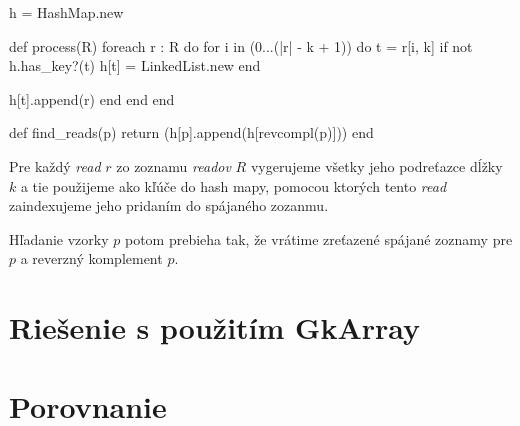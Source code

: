 \begin{pseudocode}[label=lst:hash_algorithm,caption={Algoritmus na riešenie
problému zarovnania readov pomocou hash mapy}]
h = HashMap.new

def process(R)
  foreach r : R do
    for i in (0...(|r| - k + 1)) do
      t = r[i, k]
      if not h.has_key?(t)
        h[t] = LinkedList.new
      end
        
      h[t].append(r)
    end 
  end
end

def find_reads(p)
  return (h[p].append(h[revcompl(p)]))
end
\end{pseudocode}

Pre každý \emph{read} $r$ zo zoznamu \emph{readov} $R$ vygerujeme všetky jeho
podreťazce dĺžky $k$ a tie použijeme ako kľúče do hash mapy, pomocou ktorých
tento \emph{read} zaindexujeme jeho pridaním do spájaného zozanmu.

Hľadanie vzorky $p$ potom prebieha tak, že vrátime zreťazené spájané
zoznamy pre $p$ a reverzný komplement $p$.



\section{Riešenie s použitím GkArray}

\section{Porovnanie}